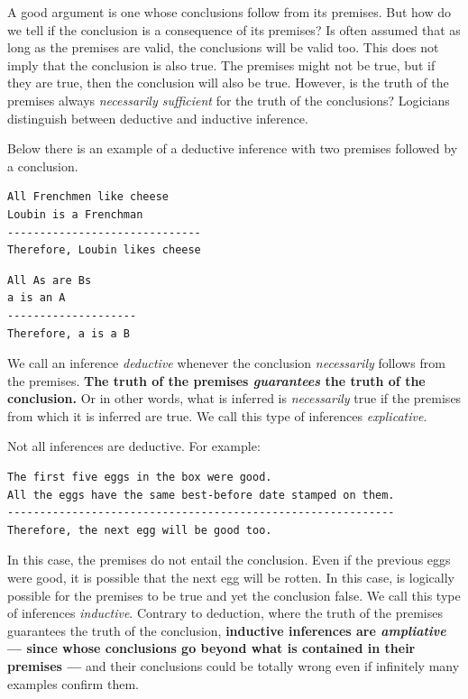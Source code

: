 \documentclass[
]{book}
\begin{document}
A good argument is one whose conclusions follow from its premises. But how do we tell if the conclusion is a consequence of its premises? Is often assumed that as long as the premises are valid, the conclusions will be valid too. This does not imply that the conclusion is also true. The premises might not be true, but if they are true, then the conclusion will also be true. However, is the truth of the premises always \emph{necessarily sufficient} for the truth of the conclusions? Logicians distinguish between deductive and inductive inference. \citep{sep-abduction}

Below there is an example of a deductive inference with two premises followed by a conclusion.

\begin{verbatim}
All Frenchmen like cheese
Loubin is a Frenchman
------------------------------
Therefore, Loubin likes cheese
\end{verbatim}

\begin{verbatim}
All As are Bs
a is an A
--------------------
Therefore, a is a B
\end{verbatim}

We call an inference \emph{deductive} whenever the conclusion \emph{necessarily} follows from the premises. \textbf{The truth of the premises \emph{guarantees} the truth of the conclusion.} Or in other words, what is inferred is \emph{necessarily} true if the premises from which it is inferred are true. We call this type of inferences \emph{explicative}.

Not all inferences are deductive. For example:

\begin{verbatim}
The first five eggs in the box were good.
All the eggs have the same best-before date stamped on them.
------------------------------------------------------------
Therefore, the next egg will be good too.
\end{verbatim}

In this case, the premises do not entail the conclusion. Even if the previous eggs were good, it is possible that the next egg will be rotten. In this case, is logically possible for the premises to be true and yet the conclusion false. We call this type of inferences \emph{inductive}. Contrary to deduction, where the truth of the premises guarantees the truth of the conclusion, \textbf{inductive inferences are \emph{ampliative} --- since whose conclusions go beyond what is contained in their premises ---} and their conclusions could be totally wrong even if infinitely many examples confirm them. \citep{bergadano1991problem}
\end{document}
